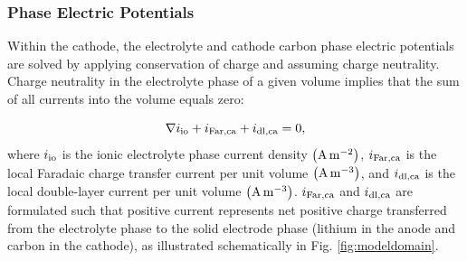 \documentclass{elsarticle}
\begin{document}
\subsubsection{Phase Electric Potentials}
 Within the cathode, the electrolyte and cathode carbon phase electric potentials are solved by applying conservation of charge and assuming charge neutrality. Charge neutrality in the electrolyte phase of a given volume implies that the sum of all currents into the volume equals zero:

 \begin{equation}\label{eq:ChargeCons_elyte}
     \nabla i_{\rm io} + i_{\rm Far,ca} + i_{\rm dl,ca} = 0,
 \end{equation}
where $i_{\rm io}$ is the ionic electrolyte phase current density ${\rm \left(A\,m^{-2}\right)}$, $i_{\rm Far,ca}$ is the local Faradaic charge transfer current per unit volume ${\rm \left(A\,m^{-3}\right)}$, and $i_{\rm dl,ca}$ is the local double-layer current per unit volume ${\rm \left(A\,m^{-3}\right)}$.  $i_{\rm Far,ca}$ and $i_{\rm dl,ca}$ are formulated such that positive current represents net positive charge transferred from the electrolyte phase to the solid electrode phase (lithium in the anode and carbon in the cathode), as illustrated schematically in Fig. \ref{fig:modeldomain}. 

\end{document}
